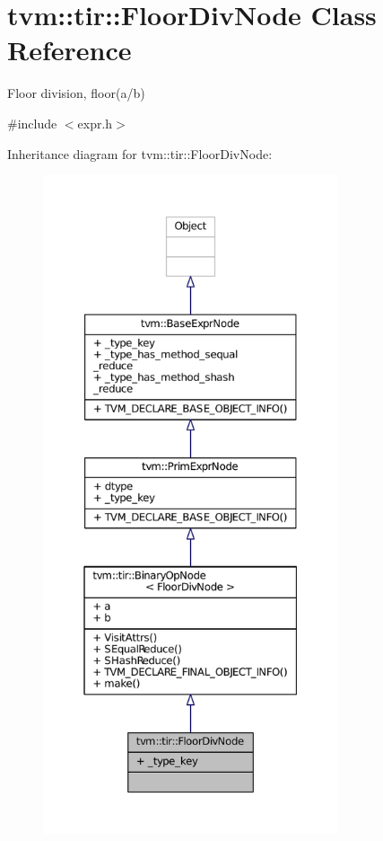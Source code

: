 \hypertarget{classtvm_1_1tir_1_1FloorDivNode}{}\section{tvm\+:\+:tir\+:\+:Floor\+Div\+Node Class Reference}
\label{classtvm_1_1tir_1_1FloorDivNode}


Floor division, floor(a/b)  




{\ttfamily \#include $<$expr.\+h$>$}



Inheritance diagram for tvm\+:\+:tir\+:\+:Floor\+Div\+Node\+:
\nopagebreak
\begin{figure}[H]
\begin{center}
\leavevmode
\includegraphics[height=550pt]{classtvm_1_1tir_1_1FloorDivNode__inherit__graph}
\end{center}
\end{figure}


